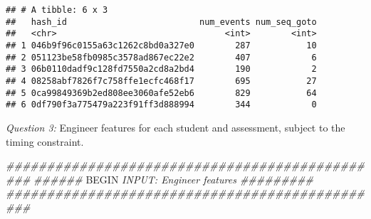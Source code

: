 \documentclass[
]{article}
\newenvironment{Shaded}{\begin{snugshade}}{\end{snugshade}}
\newcommand{\CommentTok}[1]{\textcolor[rgb]{0.56,0.35,0.01}{\textit{#1}}}
\newcommand{\RegionMarkerTok}[1]{#1}
\begin{document}
\begin{verbatim}
## # A tibble: 6 x 3
##   hash_id                          num_events num_seq_goto
##   <chr>                                 <int>        <int>
## 1 046b9f96c0155a63c1262c8bd0a327e0        287           10
## 2 051123be58fb0985c3578ad867ec22e2        407            6
## 3 06b0110dadf9c128fd7550a2cd8a2bd4        190            2
## 4 08258abf7826f7c758ffe1ecfc468f17        695           27
## 5 0ca99849369b2ed808ee3060afe52eb6        829           64
## 6 0df790f3a775479a223f91ff3d888994        344            0
\end{verbatim}

\emph{Question 3:} Engineer features for each student and assessment,
subject to the timing constraint.

\begin{Shaded}
\begin{Highlighting}[]
\CommentTok{############################################### }
\CommentTok{###### }\RegionMarkerTok{BEGIN}\CommentTok{ INPUT: Engineer features #########}
\CommentTok{###############################################}


\end{Highlighting}
\end{Shaded}
\end{document}
